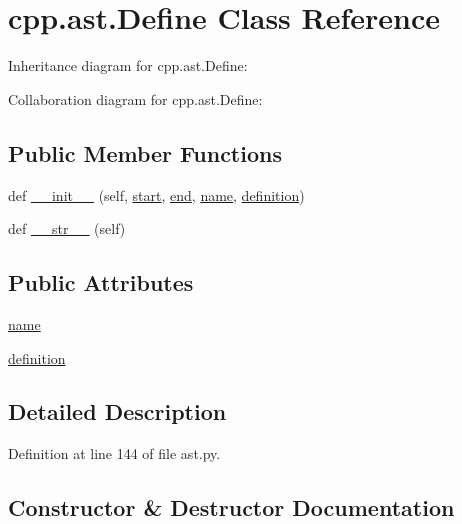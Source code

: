 \hypertarget{classcpp_1_1ast_1_1_define}{}\section{cpp.\+ast.\+Define Class Reference}
\label{classcpp_1_1ast_1_1_define}


Inheritance diagram for cpp.\+ast.\+Define\+:


Collaboration diagram for cpp.\+ast.\+Define\+:
\subsection*{Public Member Functions}
\begin{DoxyCompactItemize}
\item 
def \hyperlink{classcpp_1_1ast_1_1_define_ae9af61866e010a863ba9f8818ec8924c}{\+\_\+\+\_\+init\+\_\+\+\_\+} (self, \hyperlink{classcpp_1_1ast_1_1_node_a7b2aa97e6a049bb1a93aea48c48f1f44}{start}, \hyperlink{classcpp_1_1ast_1_1_node_a3c5e5246ccf619df28eca02e29d69647}{end}, \hyperlink{classcpp_1_1ast_1_1_define_a8879216f09e88f79d7baa49bcfa10ebd}{name}, \hyperlink{classcpp_1_1ast_1_1_define_a0c636652dfeb2f15e62793afea1153c9}{definition})
\item 
def \hyperlink{classcpp_1_1ast_1_1_define_aa89732914b19901c8d291e11f34bb627}{\+\_\+\+\_\+str\+\_\+\+\_\+} (self)
\end{DoxyCompactItemize}
\subsection*{Public Attributes}
\begin{DoxyCompactItemize}
\item 
\hyperlink{classcpp_1_1ast_1_1_define_a8879216f09e88f79d7baa49bcfa10ebd}{name}
\item 
\hyperlink{classcpp_1_1ast_1_1_define_a0c636652dfeb2f15e62793afea1153c9}{definition}
\end{DoxyCompactItemize}


\subsection{Detailed Description}


Definition at line 144 of file ast.\+py.



\subsection{Constructor \& Destructor Documentation}
